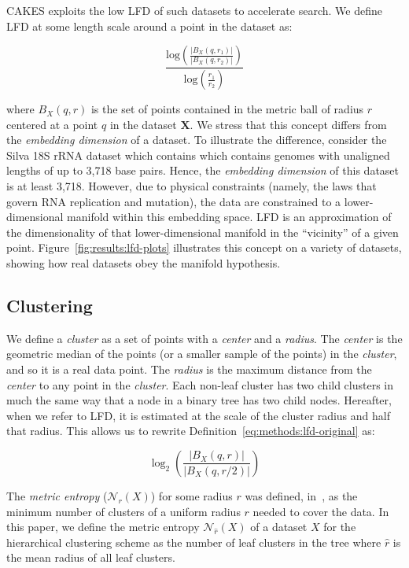 CAKES exploits the low LFD of such datasets to accelerate search.
We define LFD at some length scale around a point in the dataset as:

\begin{equation}
    \frac{\text{log} \left( \frac{|B_X(q, r_1)|}{|B_X(q, r_2)|} \right) }{\text{log} \left( \frac{r_1}{r_2} \right) }
    \label{eq:methods:lfd-original}
\end{equation}

where $B_X(q, r)$ is the set of points contained in the metric ball of radius $r$ centered at a point $q$ in the dataset $\textbf{X}$.
We stress that this concept differs from the \emph{embedding dimension} of a dataset.
To illustrate the difference, consider the Silva 18S rRNA dataset which contains which contains genomes with unaligned lengths of up to 3,718 base pairs.
Hence, the \emph{embedding dimension} of this dataset is at least 3,718.
However, due to physical constraints (namely, the laws that govern RNA replication and mutation), the data are constrained to a lower-dimensional manifold within this embedding space.
LFD is an approximation of the dimensionality of that lower-dimensional manifold in the ``vicinity'' of a given point.
Figure~\ref{fig:results:lfd-plots} illustrates this concept on a variety of datasets, showing how real datasets obey the manifold hypothesis.


\subsection{Clustering}
\label{sec:methods:clustering}

We define a \emph{cluster} as a set of points with a \emph{center} and a \emph{radius}.
The \emph{center} is the geometric median of the points (or a smaller sample of the points) in the \emph{cluster}, and so it is a real data point.
The \emph{radius} is the maximum distance from the \emph{center} to any point in the \emph{cluster}.
Each non-leaf cluster has two child clusters in much the same way that a node in a binary tree has two child nodes.
Hereafter, when we refer to LFD, it is estimated at the scale of the cluster radius and half that radius.
This allows us to rewrite Definition~\ref{eq:methods:lfd-original} as:

\begin{equation}
    \log_2 \left( \frac{|B_X(q, r)|}{|B_X(q, r/2)|} \right)
    \label{eq:methods:lfd-simplified}
\end{equation}

The \emph{metric entropy} ($\mathcal{N}_{r}(X)$) for some radius $r$ was defined, in~\cite{yu2015entropy}, as the minimum number of clusters of a uniform radius $r$ needed to cover the data.
In this paper, we define the metric entropy $\mathcal{N}_{\hat{r}}(X)$ of a dataset $X$ for the hierarchical clustering scheme as the number of leaf clusters in the tree where $\hat{r}$ is the mean radius of all leaf clusters.


